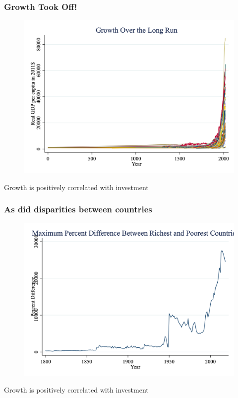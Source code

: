 \documentclass{beamer}
\begin{document}
\begin{frame}
\frametitle[alignment=center]{Growth Took Off!}
\begin{figure}
\centering
\includegraphics[scale=0.2]{Figures/Fig_7pt0a.png}
\end{figure}
Growth is positively correlated with investment
\end{frame}

\begin{frame}
\frametitle[alignment=center]{As did disparities between countries}
\begin{figure}
\centering
\includegraphics[scale=0.25]{Figures/Fig_7pt0b.png}
\end{figure}
Growth is positively correlated with investment
\end{frame}
\end{document}

